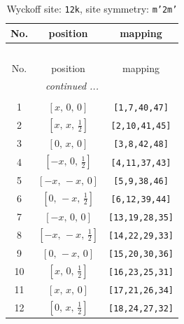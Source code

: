 \documentclass[fleqn,8pt]{jsarticle}
\begin{document}
\begin{longtable}{ccc}
\caption{Wyckoff site: {\tt 12k}, site symmetry: {\tt m'2m'}}
 \\
 \hline \hline
No. & position & mapping \\ \hline \endfirsthead

\multicolumn{2}{l}{\tablename\ \thetable{}} \\
 \hline \hline
No. & position & mapping \\ \hline \endhead

 \hline \hline
\multicolumn{2}{r}{\footnotesize\it continued ...} \\ \endfoot

 \hline \hline
\multicolumn{2}{r}{} \\ \endlastfoot

1 & $\left[ x,\, 0,\, 0 \right]$ & {\tt [1,7,40,47]} \\ \hline
2 & $\left[ x,\, x,\, \frac{1}{2} \right]$ & {\tt [2,10,41,45]} \\ \hline
3 & $\left[ 0,\, x,\, 0 \right]$ & {\tt [3,8,42,48]} \\ \hline
4 & $\left[ - x,\, 0,\, \frac{1}{2} \right]$ & {\tt [4,11,37,43]} \\ \hline
5 & $\left[ - x,\, - x,\, 0 \right]$ & {\tt [5,9,38,46]} \\ \hline
6 & $\left[ 0,\, - x,\, \frac{1}{2} \right]$ & {\tt [6,12,39,44]} \\ \hline
7 & $\left[ - x,\, 0,\, 0 \right]$ & {\tt [13,19,28,35]} \\ \hline
8 & $\left[ - x,\, - x,\, \frac{1}{2} \right]$ & {\tt [14,22,29,33]} \\ \hline
9 & $\left[ 0,\, - x,\, 0 \right]$ & {\tt [15,20,30,36]} \\ \hline
10 & $\left[ x,\, 0,\, \frac{1}{2} \right]$ & {\tt [16,23,25,31]} \\ \hline
11 & $\left[ x,\, x,\, 0 \right]$ & {\tt [17,21,26,34]} \\ \hline
12 & $\left[ 0,\, x,\, \frac{1}{2} \right]$ & {\tt [18,24,27,32]} \\
\end{longtable}
\renewcommand{\arraystretch}{1.2}
\end{document}
